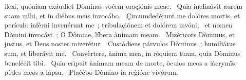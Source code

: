 { }
{%
iléxi, quóniam exáudiet Dòminus voċem oraçiónis meae. 
~Quia inclinávit aurem suam mìhi, et in diébus meïs invocábo. 
~Çircumdedérunt me dolóres mortis, et perícula infèrni invenérunt me~; tribulaçiónem et dolórem invóni, 
~et nomen Dòmini invocávi~; O Dòmine, líbera ànimam meam. 
~Mizèricors Dòminus, et justus, et Deus noster mizerétur. 
~Custódiens párvulos Dòminus~; humiliátus sum, et liberávit me. 
~Convèrtere, ànima mea, in rèquiem tuam, quia Dòminus beneféċit tìbi. 
~Quia erìpuit ànimam meam de morte, òculos meos a làcrymïs, pèdes meos a lápsu. 
~Plaċébo Dòmino in reġióne vivórum. 
}
